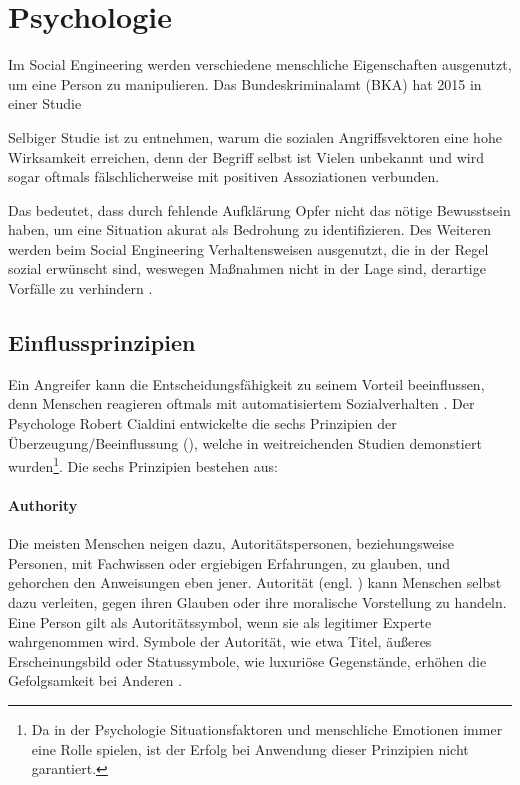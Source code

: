 \chapter{Psychologie}
\label{chapter:psychologie}

Im Social Engineering werden verschiedene menschliche Eigenschaften ausgenutzt, um eine Person zu manipulieren.
Das Bundeskriminalamt (BKA) hat 2015 in einer Studie 

Selbiger Studie ist zu entnehmen, warum die sozialen Angriffsvektoren eine hohe Wirksamkeit erreichen, denn der Begriff selbst
ist Vielen unbekannt und wird sogar oftmals fälschlicherweise mit positiven Assoziationen verbunden.

Das bedeutet, dass durch fehlende Aufklärung Opfer nicht das nötige Bewusstsein haben, um eine Situation akurat als Bedrohung zu identifizieren.
Des Weiteren werden beim Social Engineering Verhaltensweisen ausgenutzt, die in der Regel sozial erwünscht sind, weswegen Maßnahmen nicht in der Lage sind, derartige Vorfälle zu verhindern .

\section{Einflussprinzipien}

Ein Angreifer kann die Entscheidungsfähigkeit zu seinem Vorteil beeinflussen, denn Menschen reagieren oftmals mit automatisiertem Sozialverhalten .
Der Psychologe Robert Cialdini entwickelte die sechs Prinzipien der Überzeugung/Beeinflussung (),
welche in weitreichenden Studien demonstiert wurden\footnote{Da in der Psychologie Situationsfaktoren und menschliche Emotionen immer eine Rolle spielen, ist der Erfolg bei Anwendung dieser Prinzipien nicht garantiert.}.
Die sechs Prinzipien bestehen aus:

\subsubsection{Authority}
Die meisten Menschen neigen dazu, Autoritätspersonen, beziehungsweise Personen, mit Fachwissen oder ergiebigen Erfahrungen, zu glauben, und gehorchen den Anweisungen eben jener.
Autorität (engl. ) kann Menschen selbst dazu verleiten, gegen ihren Glauben oder ihre moralische Vorstellung zu handeln.
Eine Person gilt als Autoritätssymbol, wenn sie als legitimer Experte wahrgenommen wird. Symbole der Autorität, wie etwa Titel, äußeres Erscheinungsbild oder Statussymbole, wie
luxuriöse Gegenstände, erhöhen die Gefolgsamkeit bei Anderen .

